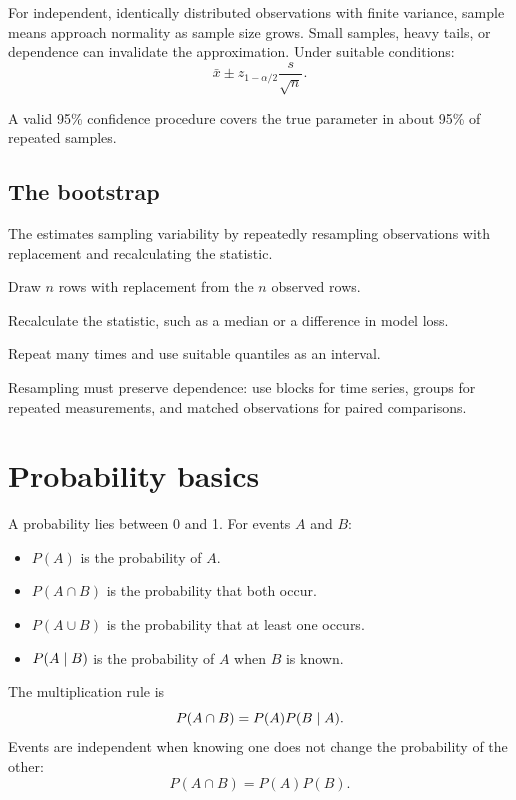 For independent, identically distributed observations with finite variance, sample means approach normality as sample size grows. Small samples, heavy tails, or dependence can invalidate the approximation. Under suitable conditions:
\[
  \bar{x}\pm z_{1-\alpha/2}\frac{s}{\sqrt{n}}.
\]

A valid 95\% confidence procedure covers the true parameter in about 95\% of repeated samples.

\subsection{The bootstrap}

The  estimates sampling variability by repeatedly resampling observations with replacement and recalculating the statistic.

\begin{mlsteps}
  \item Draw $n$ rows with replacement from the $n$ observed rows.
  \item Recalculate the statistic, such as a median or a difference in model loss.
  \item Repeat many times and use suitable quantiles as an interval.
\end{mlsteps}

Resampling must preserve dependence: use blocks for time series, groups for repeated measurements, and matched observations for paired comparisons.

\section{Probability basics}

A probability lies between 0 and 1. For events $A$ and $B$:

\begin{itemize}
  \item $P(A)$ is the probability of $A$.
  \item $P(A\cap B)$ is the probability that both occur.
  \item $P(A\cup B)$ is the probability that at least one occurs.
  \item $P(A\mathrel{|} B)$ is the probability of $A$ when $B$ is known.
\end{itemize}

The multiplication rule is
\[
  P(A\cap B)=P(A)P(B\mathrel{|} A).
\]
Events are independent when knowing one does not change the probability of the other:
\[
  P(A\cap B)=P(A)P(B).
\]

